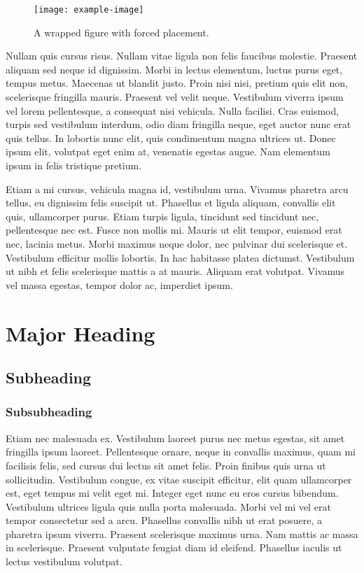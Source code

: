\documentclass[12pt]{report}
\begin{document}
\begin{figure}
    \centering
    \texttt{[image: example-image]}
    \caption{A wrapped figure with forced placement.}
\end{figure}

Nullam quis cursus risus. Nullam vitae ligula non felis faucibus molestie. Praesent aliquam sed neque id dignissim. Morbi in lectus elementum, luctus purus eget, tempus metus. Maecenas ut blandit justo. Proin nisi nisi, pretium quis elit non, scelerisque fringilla mauris. Praesent vel velit neque. Vestibulum viverra ipsum vel lorem pellentesque, a consequat nisi vehicula. Nulla facilisi. Cras euismod, turpis sed vestibulum interdum, odio diam fringilla neque, eget auctor nunc erat quis tellus. In lobortis nunc elit, quis condimentum magna ultrices ut. Donec ipsum elit, volutpat eget enim at, venenatis egestas augue. Nam elementum ipsum in felis tristique pretium.

Etiam a mi cursus, vehicula magna id, vestibulum urna. Vivamus pharetra arcu tellus, eu dignissim felis suscipit ut. Phasellus et ligula aliquam, convallis elit quis, ullamcorper purus. Etiam turpis ligula, tincidunt sed tincidunt nec, pellentesque nec est. Fusce non mollis mi. Mauris ut elit tempor, euismod erat nec, lacinia metus. Morbi maximus neque dolor, nec pulvinar dui scelerisque et. Vestibulum efficitur mollis lobortis. In hac habitasse platea dictumst. Vestibulum ut nibh et felis scelerisque mattis a at mauris. Aliquam erat volutpat. Vivamus vel massa egestas, tempor dolor ac, imperdiet ipsum.

\section{Major Heading}
\subsection{Subheading}
\subsubsection{Subsubheading}
Etiam nec malesuada ex. Vestibulum laoreet purus nec metus egestas, sit amet fringilla ipsum laoreet. Pellentesque ornare, neque in convallis maximus, quam mi facilisis felis, sed cursus dui lectus sit amet felis. Proin finibus quis urna ut sollicitudin. Vestibulum congue, ex vitae suscipit efficitur, elit quam ullamcorper est, eget tempus mi velit eget mi. Integer eget nunc eu eros cursus bibendum. Vestibulum ultrices ligula quis nulla porta malesuada. Morbi vel mi vel erat tempor consectetur sed a arcu. Phasellus convallis nibh ut erat posuere, a pharetra ipsum viverra. Praesent scelerisque maximus urna. Nam mattis ac massa in scelerisque. Praesent vulputate feugiat diam id eleifend. Phasellus iaculis ut lectus vestibulum volutpat.
\end{document}
